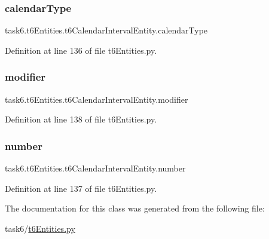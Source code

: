 \subsubsection{\texorpdfstring{calendar\+Type}{calendarType}}
{\footnotesize\ttfamily task6.\+t6\+Entities.\+t6\+Calendar\+Interval\+Entity.\+calendar\+Type}



Definition at line 136 of file t6\+Entities.\+py.

\mbox{\label{classtask6_1_1t6Entities_1_1t6CalendarIntervalEntity_a235a03982b4d7a11aba3099918d90603}} 
\subsubsection{\texorpdfstring{modifier}{modifier}}
{\footnotesize\ttfamily task6.\+t6\+Entities.\+t6\+Calendar\+Interval\+Entity.\+modifier}



Definition at line 138 of file t6\+Entities.\+py.

\mbox{\label{classtask6_1_1t6Entities_1_1t6CalendarIntervalEntity_a03d028a8bee9905395fc9408a4ab88ed}} 
\subsubsection{\texorpdfstring{number}{number}}
{\footnotesize\ttfamily task6.\+t6\+Entities.\+t6\+Calendar\+Interval\+Entity.\+number}



Definition at line 137 of file t6\+Entities.\+py.



The documentation for this class was generated from the following file\+:\begin{DoxyCompactItemize}
\item 
task6/\hyperlink{t6Entities_8py}{t6\+Entities.\+py}\end{DoxyCompactItemize}

